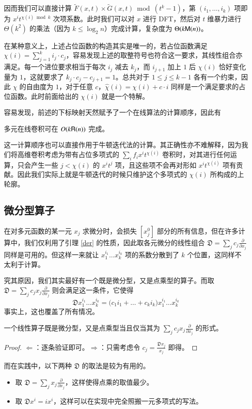 因而我们可以直接计算 $\tilde F(x,t) \times \tilde G(x, t) \bmod (t^k-1)$，第 $(i_1,\dots,i_k)$ 项即为 $x^it^{\chi(i)\bmod k}$ 次项系数。此时我们可以对 $x$ 进行 DFT，然后对 $t$ 维暴力进行 $\Theta(k^2)$ 的乘法（因为 $k\le \log_2 n$）完成计算，复杂度为 $\Theta(k\mathsf M(n))$。

在某种意义上，上述占位函数的构造其实是唯一的，若占位函数满足 $\chi(i) = \sum_{j=1}^k i_j \cdot c_j$，容易发现上述的取整符号也符合这一要求，其线性组合亦满足。每一个进位要求相当于每次 $i_j$ 减去 $k_j$，而 $i_{j+1}$ 加上 $1$ 后 $\chi(i)$ 恰好变化量为 $1$，这就要求了 $k_j\cdot c_j - c_{j+1} = 1$。总共对于 $1\le j\le k-1$ 各有一个约束，因此 $\chi$ 的自由度为 $1$，对于任意 $c$，$\widehat \chi(i) = \chi(i) + c \cdot i$ 同样是一个满足要求的占位函数。此时前面给出的 $\chi(i)$ 就是一个特解。

容易发现，前述的下标映射天然赋予了一个在线算法的计算顺序，因此有

\begin{lemma}
多元在线卷积可在 $O(k\mathsf R(n))$ 完成。
\end{lemma}

这一计算顺序也可以直接作用于牛顿迭代法的计算。其正确性亦不难解释，因为我们将高维卷积考虑为带有占位多项式的 $\sum_i f_i x^i t^{\chi(i)}$ 卷积时，对其进行任何运算，只会产生一些 $j < \chi(i)$ 的 $x^it^j$ 项，且这些项不会再对形如 $x^it^{\chi(i)}$ 项有贡献。因此我们实际上就是牛顿迭代的时候只维护这个多项式的 $\chi(i)$ 所构成的上轮廓。

\subsection{微分型算子}

在对多元函数的某一元 $x_j$ 求微分时，会损失 $[x_j^0]$ 部分的所有信息，但在许多计算中，我们仅利用了引理 \ref{der} 的性质，因此取各元微分的线性组合 $\mathfrak D=\sum_j c_j \frac{\partial}{\partial x_j}$ 同样是可用的。但这样一来就让 $x_1^{i_1}\dots x_k^{i_k}$ 项的系数分散到了 $k$ 个位置，这同样不太利于计算。

究其原因，我们其实最好有一个既是微分型，又是点乘型的算子。而取 $\mathfrak D=\sum_j c_j x_j\frac{\partial}{\partial x_j}$ 则会满足这一条件，它使得
$$
\mathfrak D x_1^{i_1}\dots x_k^{i_k} = \mathfrak (c_1i_1+\dots+c_ki_k)x_1^{i_1}\dots x_k^{i_k}
$$
事实上，这也覆盖了所有情况。
\begin{lemma}
一个线性算子既是微分型，又是点乘型当且仅当其为 $\sum_j c_j x_j\frac{\partial}{\partial x_j}$ 的形式。
\end{lemma}
\begin{proof}
$\Leftarrow$：逐条验证即可。$\Rightarrow$：只需考虑令 $c_j = \frac{\mathfrak D x_j}{x_j}$ 即得。
\end{proof}
而在实践中，以下两种 $\mathfrak D$ 的取法是较为有用的。
\begin{itemize}
\item 取 $\mathfrak D=\sum_j x_j\frac{\partial}{\partial x_j}$，这样使得点乘的取值最少。
\item 取 $\mathfrak D x^i = ix^i$，这样可以在实现中完全照搬一元多项式的写法。
\end{itemize}

